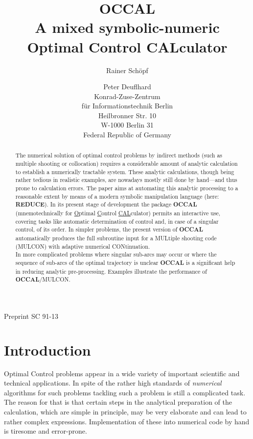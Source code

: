 \documentclass[12pt,a4paper]{article}
\title{OCCAL\\
       A mixed symbolic-numeric\\
       Optimal Control CALculator}
\date{ }
\author{Rainer Sch\"opf
        \and
        Peter Deuflhard
        \\
        Konrad-Zuse-Zentrum\\
        f\"ur Informationstechnik Berlin\\
        Heilbronner Str. 10\\
        W-1000 Berlin 31\\
        Federal Republic of Germany}
\newcommand{\OCCAL}{{\sf\bf OCCAL}}
\newcommand{\REDUCE}{{\sf\bf REDUCE}}
\newcommand{\MULCON}{{\sf MULCON}}
\begin{document}
\maketitle

\begin{abstract}

  The numerical solution of optimal control problems by indirect
  methods (such as multiple shooting or collocation) requires a
  considerable amount of analytic calculation to establish a
  numerically tractable system.  These analytic calculations, though
  being rather tedious in realistic examples, are nowadays mostly
  still done by hand---and thus prone to calculation errors.  The
  paper aims at automating this analytic processing to a reasonable
  extent by means of a modern symbolic manipulation language (here:
  \REDUCE).  In its present stage of development the package \OCCAL{}
  (mnemotechnically for \underline{O}ptimal \underline{C}ontrol
  \underline{CAL}culator) permits an interactive use, covering tasks
  like automatic determination of control and, in case of a singular
  control, of its order.
%
  In simpler problems, the present version of \OCCAL{} automatically
  produces the full subroutine input for a MULtiple shooting code
  (\MULCON) with adaptive numerical CONtinuation.\\
%
  In more complicated problems where singular sub-arcs may occur or
  where the sequence of sub-arcs of the optimal trajectory is unclear
  \OCCAL{} is a significant help in reducing analytic pre-processing.
  Examples illustrate the performance of \OCCAL/\MULCON.

\end{abstract}
\vspace*{0.5cm}
Preprint SC 91-13
\newpage

\tableofcontents

\newpage

\section{Introduction}

Optimal Control problems appear in a wide variety of important
scientific and technical applications.  In spite of the rather high
standards of {\em numerical\/} algorithms for such problems
\cite{Bock1,Bock2,Bock3,bulirsch,DFK2} tackling such a problem is
still a complicated task.  The reason for that is that certain steps in
the analytical preparation of the calculation, which are simple in
principle, may be very elaborate and can lead to rather complex
expressions.  Implementation of these into numerical code by hand is
tiresome and error-prone.
\end{document}
